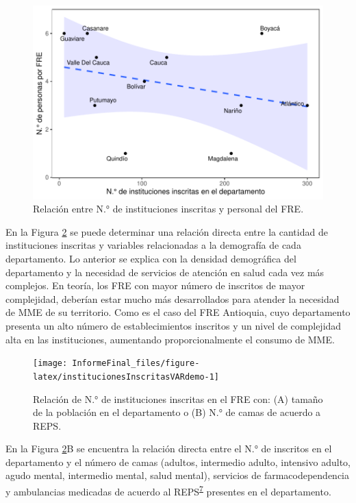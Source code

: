 \documentclass[
  oneside]{book}
\begin{document}
\begin{figure}[t]

{\centering \includegraphics[width=0.85\linewidth]{InformeFinal_files/figure-latex/institucionesInscritasRelacion-1} 

}

\caption{Relación entre N.° de instituciones inscritas y personal del FRE.}\label{fig:institucionesInscritasRelacion}
\end{figure}

En la Figura \ref{fig:institucionesInscritasVARdemo} se puede determinar una relación directa entre la cantidad de instituciones inscritas y variables relacionadas a la demografía de cada departamento. Lo anterior se explica con la densidad demográfica del departamento y la necesidad de servicios de atención en salud cada vez más complejos. En teoría, los FRE con mayor número de inscritos de mayor complejidad, deberían estar mucho más desarrollados para atender la necesidad de MME de su territorio. Como es el caso del FRE Antioquia, cuyo departamento presenta un alto número de establecimientos inscritos y un nivel de complejidad alta en las instituciones, aumentando proporcionalmente el consumo de MME.

\begin{figure}[b!]

{\centering \texttt{[image: InformeFinal\_files/figure-latex/institucionesInscritasVARdemo-1]} 

}

\caption{Relación de N.° de instituciones inscritas en el FRE con: (A) tamaño de la población en el departamento o (B) N.° de camas de acuerdo a REPS.}\label{fig:institucionesInscritasVARdemo}
\end{figure}

En la Figura \ref{fig:institucionesInscritasVARdemo}B se encuentra la relación directa entre el N.° de inscritos en el departamento y el número de camas (adultos, intermedio adulto, intensivo adulto, agudo mental, intermedio mental, salud mental), servicios de farmacodependencia y ambulancias medicadas de acuerdo al REPS\textsuperscript{\protect\hyperlink{ref-DireccionPrestaciondeServiciosyAtencionPrimaria2021}{7}} presentes en el departamento.
\end{document}
